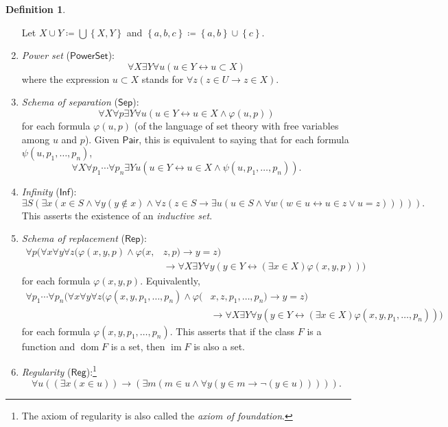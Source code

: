 \documentclass[10pt,letterpaper,cm]{nupset}
\theoremstyle{definition}
\newtheorem{definition}{Definition}[subsection]
\theoremstyle{theorem}
\theoremstyle{remark}
\newcommand{\1}{\mathbf{1}}
\newcommand{\0}{\vec 0}
\DeclareMathOperator{\im}{im}
\DeclareMathOperator{\dom}{dom}
\begin{document}
\begin{definition}
\begin{enumerate}
Let $X \cup Y \coloneqq \bigcup \left\{X, Y\right\}$ and $\left\{a,b,c\right\} \coloneqq \left\{a,b\right\} \cup \left\{c\right\}$.
\item \textit{Power set}  ($\mathsf{PowerSet}$):
\[
\forall X \exists Y \forall u(u \in Y \leftrightarrow u \subset X)
\]
where the expression $u \subset X$ stands for $\forall z(z \in U \rightarrow z \in X)$.
\item \textit{Schema of separation} ($\mathsf{Sep}$):
\[
\forall X \forall p \exists Y \forall u(u \in Y \leftrightarrow u \in X \wedge \varphi(u, p))
\]
for each formula $\varphi(u, p)$ (of the language of set theory with free variables among $u$ and $p$). Given $\mathsf{Pair}$, this is equivalent to saying that for each formula $\psi(u, p_1, \ldots, p_n)$,
\[\forall X \forall p_{1} \cdots \forall p_{n} \exists Y u\left(u \in Y \leftrightarrow u \in X \wedge \psi\left(u, p_{1}, \ldots, p_{n}\right)\right).\] 
\item \textit{Infinity} ($\mathsf{Inf}$):
\[
\exists S(\exists x(x\in S\land\forall y(y\notin x)\land\forall z(z\in S\rightarrow\exists u(u\in S\land\forall w(w\in u\leftrightarrow u\in z\lor u=z))))).
\]
This asserts the existence of an \textit{inductive set}. 
\item \textit{Schema of replacement} ($\mathsf{Rep}$):
\[
\begin{aligned} \forall p( \forall x \forall y \forall z(\varphi(x, y, p) \wedge \varphi(x,& z, p ) \rightarrow y=z ) \\ & \rightarrow \forall X \exists Y \forall y(y \in Y \leftrightarrow(\exists x \in X) \varphi(x, y, p)) )\end{aligned}
\] for each formula $\varphi(x,y, p)$. Equivalently, 
\[
\begin{aligned} \forall p_1 \cdots \forall p_n( \forall x \forall y \forall z(\varphi(x, y, p_1, \ldots, p_n) \wedge \varphi(&x, z, p_1, \ldots, p_n ) \rightarrow y=z ) \\ & \rightarrow \forall X \exists Y \forall y(y \in Y \leftrightarrow(\exists x \in X) \varphi(x, y, p_1, \ldots, p_n)) ) \end{aligned}
\] for each formula $\varphi(x, y, p_1, \ldots, p_n)$.
This asserts that if the class $F$ is a function and $\dom{F}$ is a set, then $\im{F}$ is also a set. 
\item \textit{Regularity}  ($\mathsf{Reg}$):\footnote{The axiom of regularity is also called the \textit{axiom of foundation}. }
\[
\forall u ((\exists x (x\in u)) \rightarrow (\exists m(m\in u \land \forall y(y\in m \rightarrow \neg(y \in u))))).
\]
\end{enumerate}
\end{definition}
 
\end{document}

